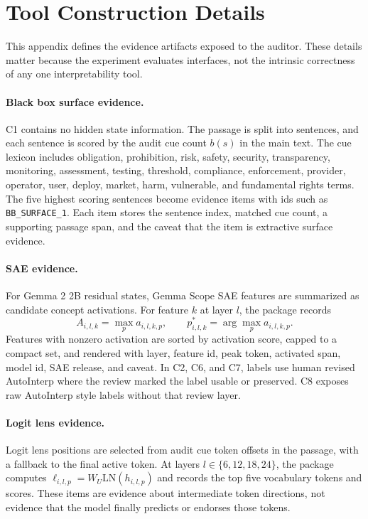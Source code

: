 \documentclass{article}
\begin{document}
\section{Tool Construction Details}

This appendix defines the evidence artifacts exposed to the auditor. These details matter because the experiment evaluates interfaces, not the intrinsic correctness of any one interpretability tool.

\paragraph{Black box surface evidence.} C1 contains no hidden state information. The passage is split into sentences, and each sentence is scored by the audit cue count $b(s)$ in the main text. The cue lexicon includes obligation, prohibition, risk, safety, security, transparency, monitoring, assessment, testing, threshold, compliance, enforcement, provider, operator, user, deploy, market, harm, vulnerable, and fundamental rights terms. The five highest scoring sentences become evidence items with ids such as \texttt{BB\_SURFACE\_1}. Each item stores the sentence index, matched cue count, a supporting passage span, and the caveat that the item is extractive surface evidence.

\paragraph{SAE evidence.} For Gemma 2 2B residual states, Gemma Scope SAE features are summarized as candidate concept activations. For feature $k$ at layer $l$, the package records
\begin{equation}
A_{i,l,k}=\max_{p} a_{i,l,k,p}, \qquad p^{*}_{i,l,k}=\arg\max_{p} a_{i,l,k,p}.
\end{equation}
Features with nonzero activation are sorted by activation score, capped to a compact set, and rendered with layer, feature id, peak token, activated span, model id, SAE release, and caveat. In C2, C6, and C7, labels use human revised AutoInterp where the review marked the label usable or preserved. C8 exposes raw AutoInterp style labels without that review layer.

\paragraph{Logit lens evidence.} Logit lens positions are selected from audit cue token offsets in the passage, with a fallback to the final active token. At layers $l\in\{6,12,18,24\}$, the package computes $\ell_{i,l,p}=W_U\mathrm{LN}(h_{i,l,p})$ and records the top five vocabulary tokens and scores. These items are evidence about intermediate token directions, not evidence that the model finally predicts or endorses those tokens.
\end{document}

